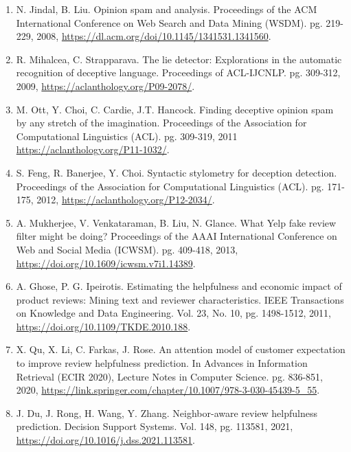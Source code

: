 \documentclass[12pt]{article}
\begin{document}
\begin{enumerate}

\item  N. Jindal, B. Liu. Opinion spam and analysis. Proceedings of the ACM International Conference on Web Search and Data Mining (WSDM). pg. 219-229, 2008,
\url{https://dl.acm.org/doi/10.1145/1341531.1341560}.


\item  R. Mihalcea, C. Strapparava. The lie detector: Explorations in the automatic recognition of deceptive language. Proceedings of ACL-IJCNLP. pg. 309-312, 2009,
\url{https://aclanthology.org/P09-2078/}.

\item M. Ott, Y. Choi, C. Cardie, J.T. Hancock. Finding deceptive opinion spam by any stretch of the imagination. Proceedings of the Association for Computational Linguistics (ACL). pg. 309-319, 2011
\url{https://aclanthology.org/P11-1032/}.

\item  S. Feng, R. Banerjee, Y. Choi. Syntactic stylometry for deception detection. Proceedings of the Association for Computational Linguistics (ACL). pg. 171-175, 2012, 
\url{https://aclanthology.org/P12-2034/}.

\item A. Mukherjee, V. Venkataraman, B. Liu, N. Glance. What Yelp fake review filter might be doing? Proceedings of the AAAI International Conference on Web and Social Media (ICWSM). pg. 409-418, 2013,   
\url{https://doi.org/10.1609/icwsm.v7i1.14389}.

\item A. Ghose, P. G. Ipeirotis. Estimating the helpfulness and economic impact of product reviews: Mining text and reviewer characteristics. IEEE Transactions on Knowledge and Data Engineering. Vol. 23, No. 10, pg. 1498-1512, 2011,   
\url{https://doi.org/10.1109/TKDE.2010.188}.
\item X. Qu, X. Li, C. Farkas, J. Rose. An attention model of customer expectation to improve review helpfulness prediction. In Advances in Information Retrieval (ECIR 2020), Lecture Notes in Computer Science. pg. 836-851, 2020,   
\url{https://link.springer.com/chapter/10.1007/978-3-030-45439-5_55}.

\item J. Du, J. Rong, H. Wang, Y. Zhang. Neighbor-aware review helpfulness prediction. Decision Support Systems. Vol. 148, pg. 113581, 2021,
\url{https://doi.org/10.1016/j.dss.2021.113581}.  
  

\end{enumerate}
\end{document}
